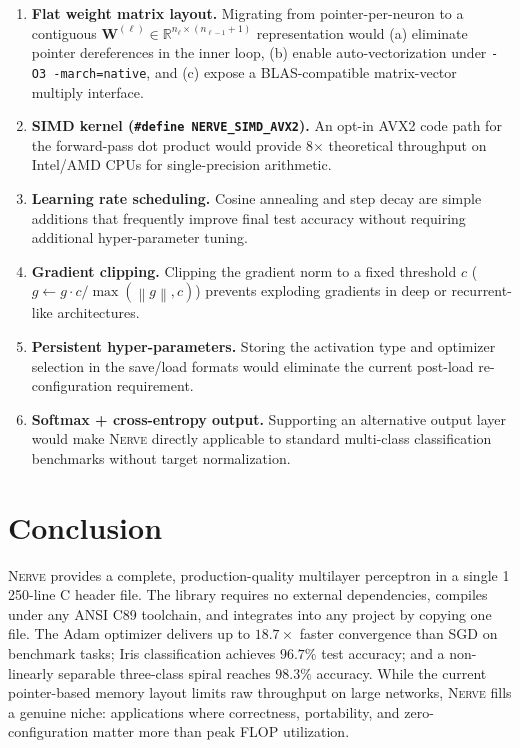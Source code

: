\documentclass[11pt,a4paper]{article}
\newcommand{\nerve}{\textsc{Nerve}}
\newcommand{\R}{\mathbb{R}}
\newcommand{\norm}[1]{\left\lVert#1\right\rVert}
\begin{document}
\begin{enumerate}[leftmargin=2.4em]
  \item \textbf{Flat weight matrix layout.} Migrating from pointer-per-neuron
    to a contiguous $\mathbf{W}^{(\ell)} \in \R^{n_\ell \times (n_{\ell-1}+1)}$
    representation would (a) eliminate pointer dereferences in the inner loop,
    (b) enable auto-vectorization under \texttt{-O3 -march=native}, and
    (c) expose a BLAS-compatible matrix-vector multiply interface.

  \item \textbf{SIMD kernel (\texttt{\#define NERVE\_SIMD\_AVX2}).} An opt-in
    AVX2 code path for the forward-pass dot product would provide
    8$\times$ theoretical throughput on Intel/AMD CPUs for
    single-precision arithmetic.

  \item \textbf{Learning rate scheduling.} Cosine annealing and step decay
    are simple additions that frequently improve final test accuracy without
    requiring additional hyper-parameter tuning.

  \item \textbf{Gradient clipping.} Clipping the gradient norm to a fixed
    threshold $c$ ($g \leftarrow g \cdot c / \max(\norm{g}, c)$) prevents
    exploding gradients in deep or recurrent-like architectures.

  \item \textbf{Persistent hyper-parameters.} Storing the activation type
    and optimizer selection in the save/load formats would eliminate the
    current post-load re-configuration requirement.

  \item \textbf{Softmax + cross-entropy output.} Supporting an alternative
    output layer would make \nerve{} directly applicable to standard
    multi-class classification benchmarks without target normalization.
\end{enumerate}

\section{Conclusion}

\nerve{} provides a complete, production-quality multilayer perceptron
in a single 1\,250-line C header file. The library requires no external
dependencies, compiles under any ANSI C89 toolchain, and integrates into
any project by copying one file. The Adam optimizer delivers up to
$18.7\times$ faster convergence than SGD on benchmark tasks; Iris classification
achieves $96.7\%$ test accuracy; and a non-linearly separable three-class
spiral reaches $98.3\%$ accuracy. While the current pointer-based memory
layout limits raw throughput on large networks, \nerve{} fills a genuine
niche: applications where correctness, portability, and zero-configuration
matter more than peak FLOP utilization.

\newpage


\end{document}
